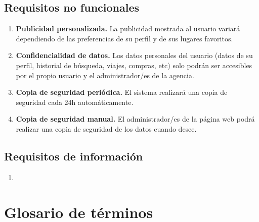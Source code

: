 \documentclass{article}
\begin{document}
	\subsection{Requisitos no funcionales}
	\begin{enumerate}
		\item {\bf Publicidad personalizada.} La publicidad mostrada al usuario variará dependiendo de las preferencias de su perfil y de sus lugares favoritos.
		\item {\bf Confidencialidad de datos.} Los datos personales del usuario (datos de su perfil, historial de búsqueda, viajes, compras, etc) solo podrán ser accesibles por el propio usuario y el administrador/es de la agencia.
		\item {\bf Copia de seguridad periódica.} El sistema realizará una copia de seguridad cada 24h automáticamente.
		\item {\bf Copia de seguridad manual.} El administrador/es de la página web podrá realizar una copia de seguridad de los datos cuando desee.
	\end{enumerate}
	\subsection{Requisitos de información}
	\begin{enumerate}
		\item 
	\end{enumerate}
	\section{Glosario de términos}
\end{document}
